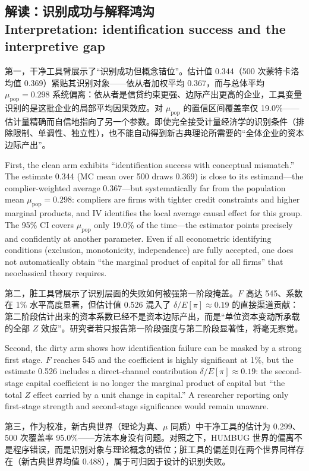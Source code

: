 \documentclass[12pt,a4paper]{ctexart}
\begin{document}
\subsection[解读]{解读：识别成功与解释鸿沟\\[1pt]\normalsize Interpretation: identification success and the interpretive gap}

第一，干净工具臂展示了“识别成功但概念错位”。估计值 0.344（500 次蒙特卡洛均值 0.369）紧贴其识别对象——依从者加权平均 0.367，而与总体平均 $\mu_{\mathrm{pop}} = 0.298$ 系统偏离：依从者是信贷约束更强、边际产出更高的企业，工具变量识别的是这批企业的局部平均因果效应。对 $\mu_{\mathrm{pop}}$ 的置信区间覆盖率仅 19.0\%——估计量精确而自信地指向了另一个参数。即使完全接受计量经济学的识别条件（排除限制、单调性、独立性），也不能自动得到新古典理论所需要的“全体企业的资本边际产出”。

First, the clean arm exhibits “identification success with conceptual mismatch.” The estimate 0.344 (MC mean over 500 draws 0.369) is close to its estimand—the complier-weighted average 0.367—but systematically far from the population mean $\mu_{\mathrm{pop}}=0.298$: compliers are firms with tighter credit constraints and higher marginal products, and IV identifies the local average causal effect for this group. The 95\% CI covers $\mu_{\mathrm{pop}}$ only 19.0\% of the time—the estimator points precisely and confidently at another parameter. Even if all econometric identifying conditions (exclusion, monotonicity, independence) are fully accepted, one does not automatically obtain “the marginal product of capital for all firms” that neoclassical theory requires.

第二，脏工具臂展示了识别层面的失败如何被强第一阶段掩盖。$F$ 高达 545、系数在 1\% 水平高度显著，但估计值 0.526 混入了 $\delta/E[\pi] \approx 0.19$ 的直接渠道贡献：第二阶段估计出来的资本系数已经不是资本边际产出，而是“单位资本变动所承载的全部 $Z$ 效应”。研究者若只报告第一阶段强度与第二阶段显著性，将毫无察觉。

Second, the dirty arm shows how identification failure can be masked by a strong first stage. $F$ reaches 545 and the coefficient is highly significant at 1\%, but the estimate 0.526 includes a direct-channel contribution $\delta/E[\pi]\approx 0.19$: the second-stage capital coefficient is no longer the marginal product of capital but “the total $Z$ effect carried by a unit change in capital.” A researcher reporting only first-stage strength and second-stage significance would remain unaware.

第三，作为校准，新古典世界（理论为真、$\mu$ 同质）中干净工具的估计为 0.299、500 次覆盖率 95.0\%——方法本身没有问题。对照之下，HUMBUG 世界的偏离不是程序错误，而是识别对象与理论概念的错位；脏工具的偏差则在两个世界同样存在（新古典世界均值 0.488），属于可归因于设计的识别失败。
\end{document}
